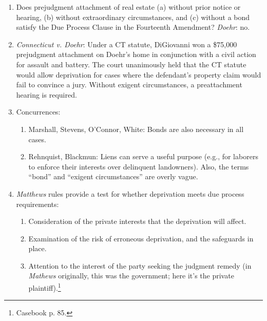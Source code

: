\begin{enumerate}
    \item Does prejudgment attachment of real estate (a) without prior notice or hearing, (b) without extraordinary circumstances, and (c) without a bond satisfy the Due Process Clause in the Fourteenth Amendment? \emph{Doehr}: no.
    \item \emph{Connecticut v. Doehr}: Under a CT statute, DiGiovanni won a \$75,000 prejudgment attachment on Doehr’s home in conjunction with a civil action for assault and battery. The court unanimously held that the CT statute would allow deprivation for cases where the defendant's property claim would fail to convince a jury. Without exigent circumstances, a preattachment hearing is required.
    \item Concurrences:
    \begin{enumerate}
        \item Marshall, Stevens, O'Connor, White: Bonds are also necessary in all cases.
        \item Rehnquist, Blackmun: Liens can serve a useful purpose (e.g., for laborers to enforce their interests over delinquent landowners). Also, the terms ``bond'' and ``exigent circumstances'' are overly vague.
    \end{enumerate}
    \item \emph{Matthews} rules provide a test for whether deprivation meets due process requirements:
    \begin{enumerate}
        \item Consideration of the private interests that the deprivation will affect.
        \item Examination of the risk of erroneous deprivation, and the safeguards in place.
        \item Attention to the interest of the party seeking the judgment remedy (in \emph{Mathews} originally, this was the government; here it's the private plaintiff).\footnote{Casebook p. 85.}
    \end{enumerate}
\end{enumerate}

